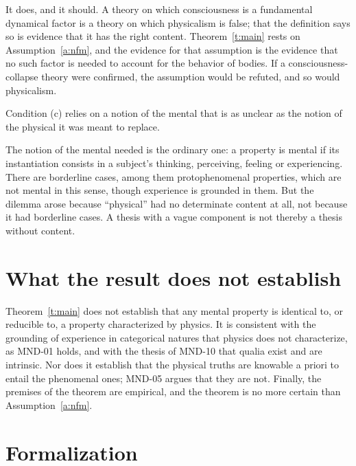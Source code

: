 \documentclass{situationist-preprint}
\begin{document}
\begin{reply}
It does, and it should. A theory on which consciousness is a fundamental dynamical factor is a theory on which physicalism is false; that the definition says so is evidence that it has the right content. Theorem~\ref{t:main} rests on Assumption~\ref{a:nfm}, and the evidence for that assumption is the evidence that no such factor is needed to account for the behavior of bodies. If a consciousness-collapse theory were confirmed, the assumption would be refuted, and so would physicalism.
\end{reply}

\begin{objection}
Condition (c) relies on a notion of the mental that is as unclear as the notion of the physical it was meant to replace.
\end{objection}

\begin{reply}
The notion of the mental needed is the ordinary one: a property is mental if its instantiation consists in a subject's thinking, perceiving, feeling or experiencing. There are borderline cases, among them protophenomenal properties, which are not mental in this sense, though experience is grounded in them. But the dilemma arose because \enquote{physical} had no determinate content at all, not because it had borderline cases. A thesis with a vague component is not thereby a thesis without content.
\end{reply}

\section{What the result does not establish}

Theorem~\ref{t:main} does not establish that any mental property is identical to, or reducible to, a property characterized by physics. It is consistent with the grounding of experience in categorical natures that physics does not characterize, as MND-01 holds, and with the thesis of MND-10 that qualia exist and are intrinsic. Nor does it establish that the physical truths are knowable a priori to entail the phenomenal ones; MND-05 argues that they are not. Finally, the premises of the theorem are empirical, and the theorem is no more certain than Assumption~\ref{a:nfm}.

\section{Formalization}
\end{document}
